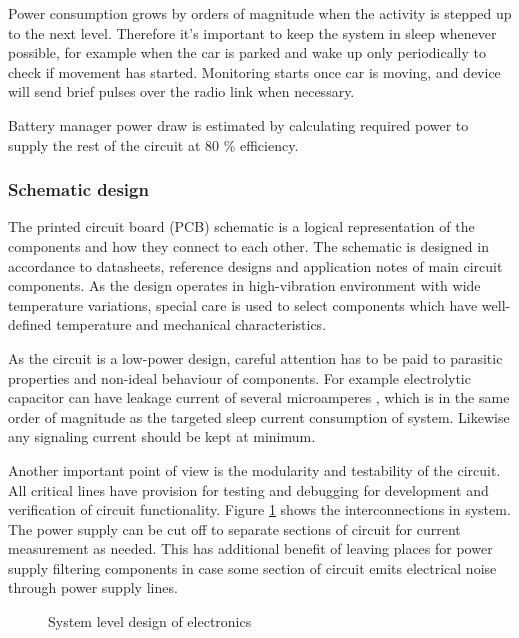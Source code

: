 Power consumption grows by orders of magnitude when the activity is stepped up to the next level. Therefore it's important to keep the system in sleep whenever possible, for example when the car is parked and wake up only periodically to check if movement has started. Monitoring starts once car is moving, and device will send brief pulses over the radio link when necessary.

Battery manager power draw is estimated by calculating required power to supply the rest of the circuit at 80 \% efficiency.

\subsubsection{Schematic design}
The printed circuit board (PCB) schematic is a logical representation of the components and how they connect to each other. The schematic is designed in accordance to datasheets, reference designs and application notes of main circuit components. As the design operates in high-vibration environment with wide temperature variations, special care is used to select components which have well-defined temperature and mechanical characteristics. 

As the circuit is a low-power design, careful attention has to be paid to parasitic properties and non-ideal behaviour of components. For example electrolytic capacitor can have leakage current of several microamperes \cite{Both2001}, which is in the same order of magnitude as the targeted sleep current consumption of system. Likewise any signaling current should be kept at minimum. 

Another important point of view is the modularity and testability of the circuit. All critical lines have provision for testing and debugging for development and verification of circuit functionality. Figure \ref{fig:circuit_blocklevel} shows the interconnections in system.  The power supply can be cut off to separate sections of circuit for current measurement as needed. This has additional benefit of leaving places for power supply filtering components in case some section of circuit emits electrical noise through power supply lines.

\begin{figure}
    \centering
    \def\svgwidth{\columnwidth}
    
    \caption{\label{fig:circuit_blocklevel} System level design of electronics}
\end{figure}

